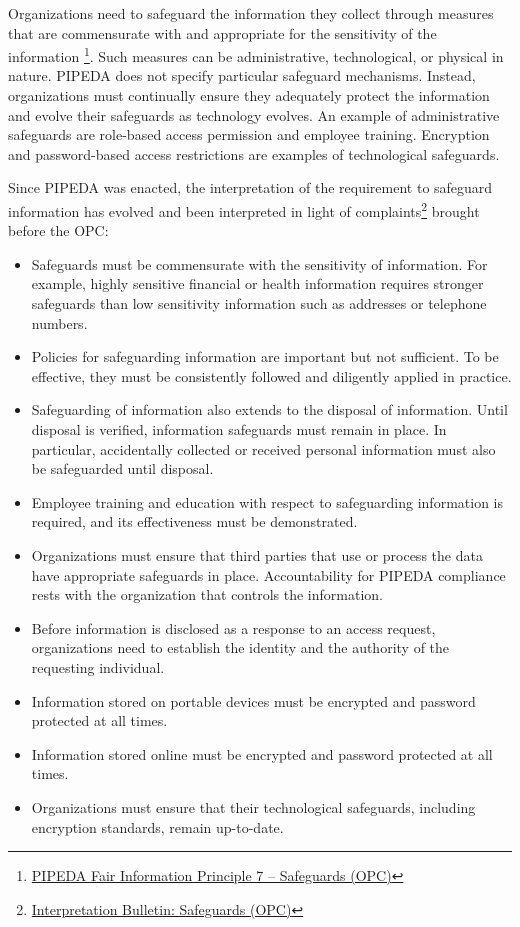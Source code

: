 Organizations need to safeguard the information they collect through measures that are commensurate with and appropriate for the sensitivity of the information \footnote{\href{https://www.priv.gc.ca/en/privacy-topics/privacy-laws-in-canada/the-personal-information-protection-and-electronic-documents-act-pipeda/p_principle/principles/p_safeguards/}{PIPEDA Fair Information Principle 7 -- Safeguards (OPC)}}. Such measures can be administrative, technological, or physical in nature. PIPEDA does not specify particular safeguard mechanisms. Instead, organizations must continually ensure they adequately protect the information and evolve their safeguards as technology evolves. An example of administrative safeguards are role-based access permission and employee training. Encryption and password-based access restrictions are examples of technological safeguards. 

Since PIPEDA was enacted, the interpretation of the requirement to safeguard information has evolved and been interpreted in light of complaints\footnote{\href{https://www.priv.gc.ca/en/privacy-topics/privacy-laws-in-canada/the-personal-information-protection-and-electronic-documents-act-pipeda/pipeda-compliance-help/pipeda-interpretation-bulletins/interpretations_08_sg/}{Interpretation Bulletin: Safeguards (OPC)}} brought before the OPC:
\begin{itemize}
  \item Safeguards must be commensurate with the sensitivity of information. For example, highly sensitive financial or health information requires stronger safeguards than low sensitivity information such as addresses or telephone numbers. 
  \item Policies for safeguarding information are important but not sufficient. To be effective, they must be consistently followed and diligently applied in practice. 
  \item Safeguarding of information also extends to the disposal of information. Until disposal is verified, information safeguards must remain in place. In particular, accidentally collected or received personal information must also be safeguarded until disposal. 
  \item Employee training and education with respect to safeguarding information is required, and its effectiveness must be demonstrated.
  \item Organizations must ensure that third parties that use or process the data have appropriate safeguards in place. Accountability for PIPEDA compliance rests with the organization that controls the information. 
  \item Before information is disclosed as a response to an access request, organizations need to establish the identity and the authority of the requesting individual. 
  \item Information stored on portable devices must be encrypted and password protected at all times.
  \item Information stored online must be encrypted and password protected at all times.
  \item Organizations must ensure that their technological safeguards, including encryption standards, remain up-to-date. 
\end{itemize}

